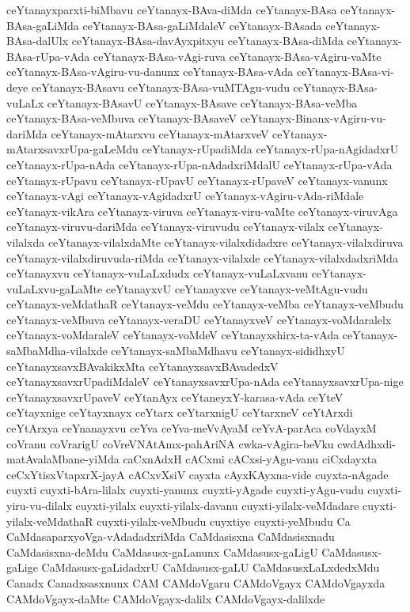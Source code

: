 {ceYtanayxparxti-biMbavu
ceYtanayx-BAva-diMda
ceYtanayx-BAsa
ceYtanayx-BAsa-gaLiMda
ceYtanayx-BAsa-gaLiMdaleV
ceYtanayx-BAsada
ceYtanayx-BAsa-dalUlx
ceYtanayx-BAsa-davAyxpitxyu
ceYtanayx-BAsa-diMda
ceYtanayx-BAsa-rUpa-vAda
ceYtanayx-BAsa-vAgi-ruva
ceYtanayx-BAsa-vAgiru-vaMte
ceYtanayx-BAsa-vAgiru-vu-danunx
ceYtanayx-BAsa-vAda
ceYtanayx-BAsa-vi-deye
ceYtanayx-BAsavu
ceYtanayx-BAsa-vuMTAgu-vudu
ceYtanayx-BAsa-vuLaLx
ceYtanayx-BAsavU
ceYtanayx-BAsave
ceYtanayx-BAsa-veMba
ceYtanayx-BAsa-veMbuva
ceYtanayx-BAsaveV
ceYtanayx-Binanx-vAgiru-vu-dariMda
ceYtanayx-mAtarxvu
ceYtanayx-mAtarxveV
ceYtanayx-mAtarxsavxrUpa-gaLeMdu
ceYtanayx-rUpadiMda
ceYtanayx-rUpa-nAgidadxrU
ceYtanayx-rUpa-nAda
ceYtanayx-rUpa-nAdadxriMdalU
ceYtanayx-rUpa-vAda
ceYtanayx-rUpavu
ceYtanayx-rUpavU
ceYtanayx-rUpaveV
ceYtanayx-vanunx
ceYtanayx-vAgi
ceYtanayx-vAgidadxrU
ceYtanayx-vAgiru-vAda-riMdale
ceYtanayx-vikAra
ceYtanayx-viruva
ceYtanayx-viru-vaMte
ceYtanayx-viruvAga
ceYtanayx-viruvu-dariMda
ceYtanayx-viruvudu
ceYtanayx-vilalx
ceYtanayx-vilalxda
ceYtanayx-vilalxdaMte
ceYtanayx-vilalxdidadxre
ceYtanayx-vilalxdiruva
ceYtanayx-vilalxdiruvuda-riMda
ceYtanayx-vilalxde
ceYtanayx-vilalxdadxriMda
ceYtanayxvu
ceYtanayx-vuLaLxdudx
ceYtanayx-vuLaLxvanu
ceYtanayx-vuLaLxvu-gaLaMte
ceYtanayxvU
ceYtanayxve
ceYtanayx-veMtAgu-vudu
ceYtanayx-veMdathaR
ceYtanayx-veMdu
ceYtanayx-veMba
ceYtanayx-veMbudu
ceYtanayx-veMbuva
ceYtanayx-veraDU
ceYtanayxveV
ceYtanayx-voMdaralelx
ceYtanayx-voMdaraleV
ceYtanayx-voMdeV
ceYtanayxshirx-ta-vAda
ceYtanayx-saMbaMdha-vilalxde
ceYtanayx-saMbaMdhavu
ceYtanayx-sididhxyU
ceYtanayxsavxBAvakikxMta
ceYtanayxsavxBAvadedxV
ceYtanayxsavxrUpadiMdaleV
ceYtanayxsavxrUpa-nAda
ceYtanayxsavxrUpa-nige
ceYtanayxsavxrUpaveV
ceYtanAyx
ceYtaneyxY-karasa-vAda
ceYteV
ceYtayxnige
ceYtayxnayx
ceYtarx
ceYtarxnigU
ceYtarxneV
ceYtArxdi
ceYtArxya
ceYnanayxvu
ceYva
ceYva-meVvAyaM
ceYvA-parAca
coVdayxM
coVranu
coVrarigU
coVreVNAtAmx-pahAriNA
cwka-vAgira-beVku
cwdAdhxdi-matAvalaMbane-yiMda
caCxnAdxH
cACxmi
cACxsi-yAgu-vanu
ciCxdayxta
ceCxYtisxVtapxrX-jayA
cACxvXsiV
cayxta
cAyxKAyxna-vide
cuyxta-nAgade
cuyxti
cuyxti-bAra-lilalx
cuyxti-yanunx
cuyxti-yAgade
cuyxti-yAgu-vudu
cuyxti-yiru-vu-dilalx
cuyxti-yilalx
cuyxti-yilalx-davanu
cuyxti-yilalx-veMdadare
cuyxti-yilalx-veMdathaR
cuyxti-yilalx-veMbudu
cuyxtiye
cuyxti-yeMbudu
Ca
CaMdasaparxyoVga-vAdadadxriMda
CaMdasisxna
CaMdasisxnadu
CaMdasisxna-deMdu
CaMdasusx-gaLanunx
CaMdasusx-gaLigU
CaMdasusx-gaLige
CaMdasusx-gaLidadxrU
CaMdasusx-gaLU
CaMdasusxLaLxdedxMdu
Canadx
Canadxsasxnunx
CAM
CAMdoVgaru
CAMdoVgayx
CAMdoVgayxda
CAMdoVgayx-daMte
CAMdoVgayx-dalilx
CAMdoVgayx-dalilxde
}
